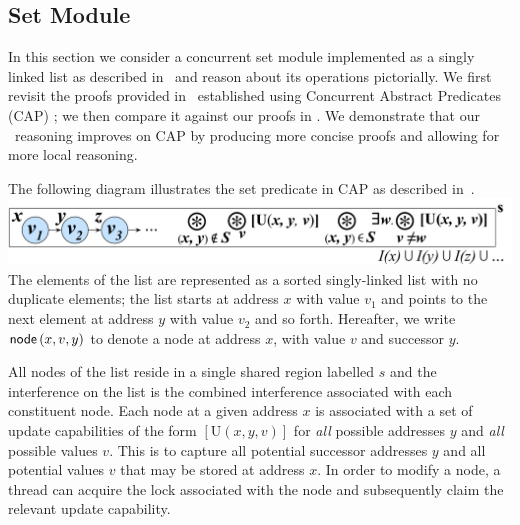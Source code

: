 \subsection{Set Module}\label{subsec:set}
In this section we consider a concurrent set module implemented as a singly linked list as described in~\cite{cap-ecoop10} and reason about its operations pictorially. We first revisit the proofs provided in~\cite{cap-ecoop10} established using Concurrent Abstract Predicates (CAP) ; we then compare it against our proofs in \colosl. We demonstrate that our \colosl\ reasoning improves on CAP by producing  more concise proofs and allowing for more local reasoning. 

The following diagram illustrates the set predicate in CAP as described in~\cite{cap-ecoop10}.
%
{\centering \includegraphics[scale=0.232]{Sections/Examples/Images/capSet.pdf}\\}
%
%
\noindent The elements of the list are represented as a sorted singly-linked list with no duplicate elements; the list starts at address $x$ with value $v_1$ and points to the next element at address $y$ with value $v_2$ and so forth. Hereafter, we write $\textsf{node}\left(x, v, y\right)$ to denote a node at address $x$, with value $v$ and successor $y$. 

All nodes of the list reside in a single shared region labelled $s$ and the interference on the list is the combined interference associated with each constituent node. 
Each node at a given address $x$ is associated with a set of update capabilities of the form $[\text{U}(x, y, v)]$ for \emph{all} possible addresses $y$ and \emph{all} possible values $v$. This is to capture all potential successor addresses $y$ and all potential values $v$ that may be stored at address $x$. 
In order to modify a node, a thread can acquire the lock associated with the node and subsequently claim the relevant update capability.
% 


